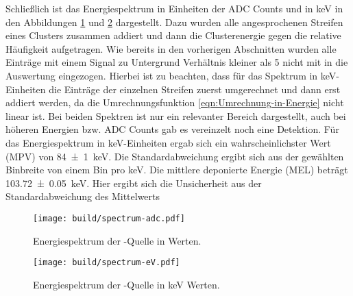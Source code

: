 Schließlich ist das Energiespektrum in Einheiten der ADC Counts und in \si{\kilo\electronvolt}
in den Abbildungen \ref{fig:spectrum-adc} und \ref{fig:spectrum-eV}
dargestellt.
Dazu wurden alle angesprochenen Streifen eines Clusters zusammen addiert und dann
die Clusterenergie gegen die relative Häufigkeit aufgetragen.
Wie bereits in den vorherigen Abschnitten wurden alle Einträge mit einem Signal zu
Untergrund Verhältnis kleiner als \num{5} nicht mit in die Auswertung eingezogen.
Hierbei ist zu beachten, dass für das Spektrum in \si{\kilo\electronvolt}-Einheiten
die Einträge der einzelnen Streifen zuerst umgerechnet und dann erst addiert werden,
da die Umrechnungsfunktion \eqref{eqn:Umrechnung-in-Energie} nicht linear ist.
Bei beiden Spektren ist nur ein relevanter Bereich dargestellt, auch bei höheren
Energien bzw. ADC Counts gab es vereinzelt noch eine Detektion.
Für das Energiespektrum in \si{\kilo\electronvolt}-Einheiten ergab sich ein
wahrscheinlichster Wert (MPV) von \SI{84(1)}{\kilo\electronvolt}.
Die Standardabweichung ergibt sich aus der gewählten Binbreite von einem Bin pro
\si{\kilo\electronvolt}.
Die mittlere deponierte Energie (MEL) beträgt \SI{103.72(5)}{\kilo\electronvolt}.
Hier ergibt sich die Unsicherheit aus der Standardabweichung des Mittelwerts
\begin{figure}
  \centering
  \texttt{[image: build/spectrum-adc.pdf]}  %
  \caption{Energiespektrum der -Quelle in \si{\adc} Werten.}
  \label{fig:spectrum-adc}
\end{figure}
\begin{figure}
  \centering
  \texttt{[image: build/spectrum-eV.pdf]}  %
  \caption{Energiespektrum der -Quelle in \si{\kilo\electronvolt} Werten.}
  \label{fig:spectrum-eV}
\end{figure}
